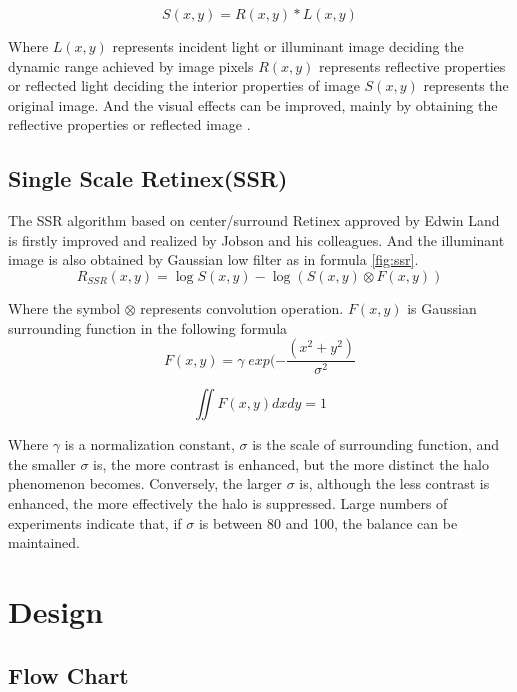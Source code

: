\begin{equation}
	S(x,y)=R(x,y)*L(x,y)
	\label{fig:illumination}
\end{equation}

Where $L(x,y)$ represents incident light or illuminant image deciding the dynamic range
achieved by image pixels $R(x,y)$ represents reflective properties or reflected light deciding the
interior properties of image $S(x,y)$ represents the original image. And the visual effects can be
improved, mainly by obtaining the reflective properties or reflected image \cite{retinex}. 

\subsection{Single Scale Retinex(SSR)}
The SSR algorithm based on center/surround Retinex approved by Edwin Land is firstly
improved and realized by Jobson and his colleagues\cite{retinex}. And the illuminant image is also obtained by Gaussian low filter as in formula \eqref{fig:ssr}\cite{ssr}.
\begin{equation}
	R_{SSR}(x,y)=\log S(x,y) - \log (S(x,y) \otimes F(x,y))
	\label{fig:ssr}
\end{equation}

Where the symbol $\otimes$ represents convolution operation. $F(x, y)$ is Gaussian surrounding
function in the following formula\cite{retinex}
\begin{equation}
	F(x,y)= \gamma \; exp(- \frac{(x^{2}+y^{2})}{\sigma^{2}}
	\label{fig:ssr1}
\end{equation}

\begin{equation}
	\iint F(x,y)dxdy = 1
	\label{fig:ssr2}
\end{equation}


Where $\gamma$ is a normalization constant, $\sigma$ is the scale of surrounding function, and the smaller $\sigma$ is, the more contrast is enhanced, but the more distinct the halo phenomenon becomes.
Conversely, the larger $\sigma$ is, although the less contrast is enhanced, the more effectively the halo is suppressed. Large numbers of experiments indicate that, if $\sigma$ is between 80 and 100, the balance can be maintained\cite{retinex}.
\clearpage
\section{Design}
\subsection{Flow Chart}

